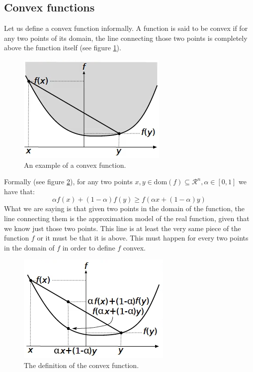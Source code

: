 \subsection{Convex functions}
\par Let us define a convex function informally. A function is said to be convex if for any two points of its domain, the line connecting those two points is completely above the function itself (see figure \ref{fig:chapter2-informal_convex_function}).
\begin{figure}
    \centering
    \includegraphics[scale=0.6]{figures/2/chapter2-informal_convex_function.png}
    \caption{An example of a convex function.}
    \label{fig:chapter2-informal_convex_function}
\end{figure}
\par Formally (see figure \ref{fig:chapter2-formal_convex_function}), for any two points $x,y \in \text{dom}(f) \subseteq \mathcal{R}^n, \alpha \in [0,1]$ we have that:
\begin{equation}
    \alpha f(x) + (1-\alpha)f(y) \geq f(\alpha x + (1-\alpha)y)
\end{equation}
What we are saying is that given two points in the domain of the function, the line connecting them is the approximation model of the real function, given that we know just those two points. This line is at least the very same piece of the function $f$ or it must be that it is above. This must happen for every two points in the domain of $f$ in order to define $f$ convex.
\begin{figure}
    \centering
    \includegraphics[scale=0.6]{figures/2/chapter2-formal_convex_function.png}
    \caption{The definition of the convex function.}
    \label{fig:chapter2-formal_convex_function}
\end{figure}
